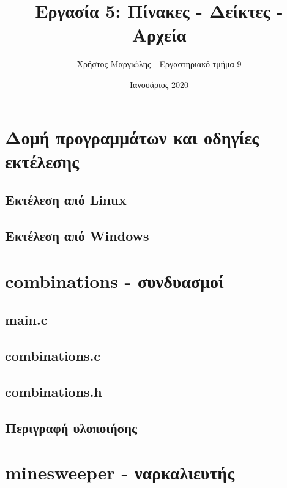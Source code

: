 \documentclass{article}
\title{Εργασία 5: Πίνακες - Δείκτες - Αρχεία}
\author{Χρήστος Μαργιώλης - Εργαστηριακό τμήμα 9}
\date{Ιανουάριος 2020}
\begin{document}
\begin{titlepage}
    \maketitle
\end{titlepage}

\renewcommand{\contentsname}{Περιεχόμενα}
\tableofcontents

\section{Δομή προγραμμάτων και οδηγίες εκτέλεσης}

    \subsection{Εκτέλεση από Linux}



    \subsection{Εκτέλεση από Windows}



\section{combinations - συνδυασμοί}

    \subsection{main.c}

    

    \subsection{combinations.c}



    \subsection{combinations.h}

    

    \subsection{Περιγραφή υλοποιήσης}

    

\section{minesweeper - ναρκαλιευτής}
\end{document}
